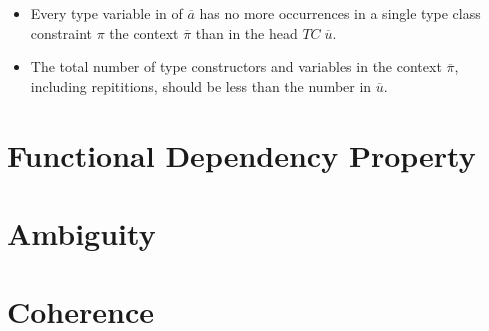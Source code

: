 \begin{itemize}
    \item Every type variable in of $\overline{a}$ has no more occurrences in a
    single type class constraint $\pi$ the context $\overline{\pi}$ than in the
    head $TC \; \overline{u}$.

    \item The total number of type constructors and variables in the context
    $\overline{\pi}$, including repititions, should be less than the number in
    $\overline{u}$.
\end{itemize}

\section{Functional Dependency Property}

\section{Ambiguity}

\section{Coherence}
